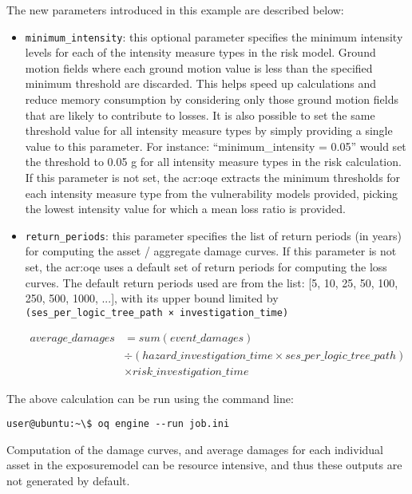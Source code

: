 The new parameters introduced in this example are described below:

\begin{itemize}

  \item \Verb+minimum_intensity+: this optional parameter specifies the minimum
    intensity levels for each of the intensity measure types in the risk model.
    Ground motion fields where each ground motion value is less than the 
    specified minimum threshold are discarded. This helps speed up calculations
    and reduce memory consumption by considering only those ground motion fields
    that are likely to contribute to losses. It is also possible to set the same
    threshold value for all intensity measure types by simply providing a single
    value to this parameter. For instance: ``minimum\_intensity = 0.05'' would
    set the threshold to 0.05 g for all intensity measure types in the risk 
    calculation.
    If this parameter is not set, the \glsdesc{acr:oqe} extracts the minimum
    thresholds for each intensity measure type from the vulnerability
    models provided, picking the lowest intensity value for which a mean loss
    ratio is provided.

  \item \Verb+return_periods+: this parameter specifies the list of return
    periods (in years) for computing the asset / aggregate damage curves.
    If this parameter is not set, the \glsdesc{acr:oqe} uses a default set of
    return periods for computing the loss curves. The default return periods
    used are from the list: [5, 10, 25, 50, 100, 250, 500, 1000, ...], with 
    its upper bound limited by \Verb+(ses_per_logic_tree_path × investigation_time)+

    \begin{equation*}
    \begin{split}
    average\_damages & = sum(event\_damages) \\
                 & \div (hazard\_investigation\_time \times ses\_per\_logic\_tree\_path) \\
                 & \times risk\_investigation\_time
    \end{split}
    \end{equation*}

\end{itemize}

The above calculation can be run using the command line:

\begin{verbatim}
user@ubuntu:~\$ oq engine --run job.ini
\end{verbatim}

Computation of the damage curves, and average damages for each
individual \gls{asset} in the \gls{exposuremodel} can be resource intensive,
and thus these outputs are not generated by default.
